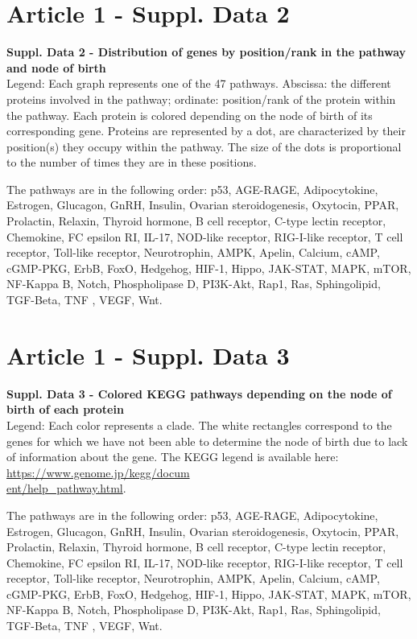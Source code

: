 \section{Article 1 - Suppl. Data 2}
\textbf{Suppl. Data 2 - Distribution of genes by position/rank in the pathway and node of birth}\\
Legend: Each graph represents one of the 47 pathways. Abscissa: the different proteins involved in the pathway; ordinate: position/rank of the protein within the pathway. Each protein is colored depending on the node of birth of its corresponding gene. Proteins are represented by a dot, are characterized by their position(s) they occupy within the pathway. The size of the dots is proportional to the number of times they are in these positions. 
\par The pathways are in the following order: 
p53, AGE-RAGE, Adipocytokine, Estrogen, Glucagon, GnRH, Insulin, Ovarian steroidogenesis, Oxytocin, PPAR, Prolactin, Relaxin, Thyroid hormone, B cell receptor, C-type lectin receptor, Chemokine, FC epsilon RI, IL-17, NOD-like receptor, RIG-I-like receptor, T cell receptor, Toll-like receptor, Neurotrophin, AMPK, Apelin, Calcium, cAMP, cGMP-PKG, ErbB, FoxO, Hedgehog, HIF-1, Hippo, JAK-STAT,  MAPK, mTOR, NF-Kappa B, Notch, Phospholipase D, PI3K-Akt, Rap1, Ras, Sphingolipid, TGF-Beta, TNF , VEGF, Wnt. 



\section{Article 1 - Suppl. Data 3}
\textbf{Suppl. Data 3 - Colored KEGG pathways depending on the node of birth of each protein}\\
Legend: Each color represents a clade. The white rectangles correspond to the genes for which we have not been able to determine the node of birth due to lack of information about the gene. The KEGG legend is available here: \href{https://www.genome.jp/kegg/document/help_pathway.html}{https://www.genome.jp/kegg/docum\\ent/help_pathway.html}.
\par The pathways are in the following order: 
p53, AGE-RAGE, Adipocytokine, Estrogen, Glucagon, GnRH, Insulin, Ovarian steroidogenesis, Oxytocin, PPAR, Prolactin, Relaxin, Thyroid hormone, B cell receptor, C-type lectin receptor, Chemokine, FC epsilon RI, IL-17, NOD-like receptor, RIG-I-like receptor, T cell receptor, Toll-like receptor, Neurotrophin, AMPK, Apelin, Calcium, cAMP, cGMP-PKG, ErbB, FoxO, Hedgehog, HIF-1, Hippo, JAK-STAT,  MAPK, mTOR, NF-Kappa B, Notch, Phospholipase D, PI3K-Akt, Rap1, Ras, Sphingolipid, TGF-Beta, TNF , VEGF, Wnt. 


